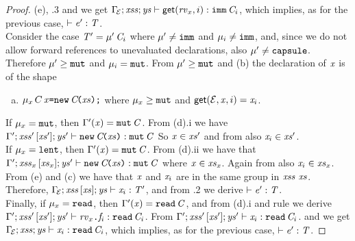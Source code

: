 {\begin{proof}
(e), .3 and  we get ${\Gamma_{\!{\cal{E}}}};\mathit{xss};\mathit{ys}\vdash \textsf{get}(\mathit{rv}_x,i):\texttt{imm}\,\mathit{C}_i$, which implies, as for the previous case, $\vdash \mathit{e}':\mathit{T}$.\\
Consider the case \underline{$\mathit{T}'=\mu'\,\mathit{C}_i$} where $\mu'\neq\texttt{imm}$ and $\mu_i\neq\texttt{imm}$, and, since we
do not allow forward references to unevaluated declarations, also $\mu'\neq\texttt{capsule}$. Therefore
$\mu'\geq\texttt{mut}$ and $\mu_i=\texttt{mut}$. From $\mu'\geq\texttt{mut}$ and (b) the declaration of $\mathit{x}$ is of the shape
\begin{enumerate} [(a)]\addtocounter{enumi}{7}
  \item $\mu_x\,C\,\mathit{x}\texttt{=}\texttt{new}\,\mathit{C}\!\texttt{(}\mathit{xs}\texttt{)}\texttt{;}$ where $\mu_x\geq\texttt{mut}$ and $\textsf{get}({\cal{E}},\mathit{x},i)=\mathit{x}_i$.
\end{enumerate}
If $\mu_x=\texttt{mut}$, then $\Gamma'(\mathit{x})=\texttt{mut}\,\mathit{C}$. From (d).i we have
$\Gamma';\mathit{xss}'\,[\mathit{xs}'];\mathit{ys}'\vdash \texttt{new}\,\mathit{C}\!\texttt{(}\mathit{xs}\texttt{)}:\texttt{mut}\,\mathit{C}$
So $\mathit{x}\in\mathit{xs}'$ and from  also $\mathit{x}_i\in\mathit{xs}'$.\\
If $\mu_x=\texttt{lent}$, then $\Gamma'(\mathit{x})=\texttt{mut}\,\mathit{C}$. From (d).ii we have that $\Gamma';\mathit{xss}_x\,[\mathit{xs}_x];\mathit{ys}'\vdash \texttt{new}\,\mathit{C}\!\texttt{(}\mathit{xs}\texttt{)}:\texttt{mut}\,\mathit{C}$
where $\mathit{x}\in\mathit{xs}_x$. Again from  also $\mathit{x}_i\in\mathit{xs}_x$.\\
From (e) and (c) we have that $\mathit{x}$ and $\mathit{x}_i$ are in the same group in $\mathit{xss}\ \mathit{xs}$. Therefore,
${\Gamma_{\!{\cal{E}}}};\mathit{xss}\,[\mathit{xs}];\mathit{ys}\vdash {\mathit{x}_i}:\mathit{T}'$, and 
from .2 we derive $\vdash \mathit{e}':\mathit{T}$.\\
Finally, if $\mu_x=\texttt{read}$, then $\Gamma'(\mathit{x})=\texttt{read}\,\mathit{C}$, and from (d).i and rule 
we derive
$\Gamma';\mathit{xss}'\,[\mathit{xs}'];\mathit{ys}'\vdash \mathit{rv}_x\texttt{.}\mathit{f}_i:\texttt{read}\,\mathit{C}_i$. From $\Gamma';\mathit{xss}'\,[\mathit{xs}'];\mathit{ys}'\vdash \mathit{x}_i:\texttt{read}\,\mathit{C}_i$. and  we get ${\Gamma_{\!{\cal{E}}}};\mathit{xss};\mathit{ys}\vdash \mathit{x}_i:\texttt{read}\,\mathit{C}_i$, which implies, as for the previous case, $\vdash \mathit{e}':\mathit{T}$.


\end{proof}}
